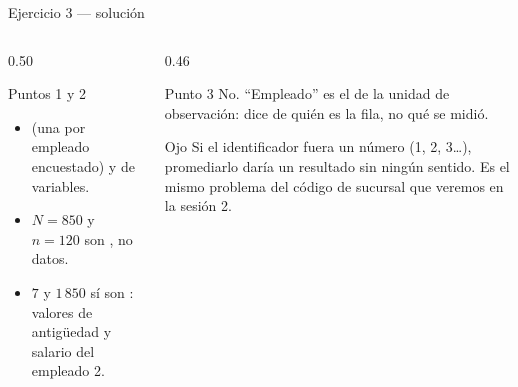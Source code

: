 \documentclass[aspectratio=169,10pt]{beamer}
\begin{document}
\begin{frame}{Ejercicio 3 — solución}
  \begin{columns}[T,onlytextwidth]
    \begin{column}{0.50\textwidth}
      \begin{block}{Puntos 1 y 2}
        \footnotesize
        \begin{itemize}
          \item {} (una por empleado encuestado) y
                 de variables.
          \item $N=850$ y $n=120$ son , no datos.
          \item $7$ y $1\,850$ sí son : valores de antigüedad y
                salario del empleado 2.
        \end{itemize}
      \end{block}
    \end{column}
    \begin{column}{0.46\textwidth}
      \begin{exampleblock}{Punto 3}
        \footnotesize
        No. ``Empleado'' es el  de la unidad de
        observación: dice de quién es la fila, no qué se midió.
      \end{exampleblock}
      \begin{alertblock}{Ojo}
        \footnotesize
        Si el identificador fuera un número (1, 2, 3\dots), promediarlo daría
        un resultado sin ningún sentido. Es el mismo problema del código de
        sucursal que veremos en la sesión 2.
      \end{alertblock}
    \end{column}
  \end{columns}
\end{frame}
\end{document}
